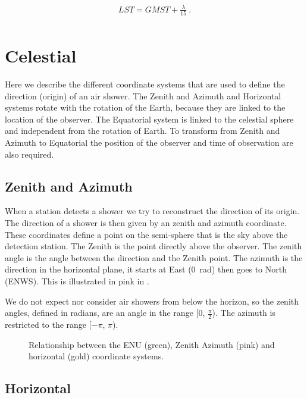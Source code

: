 \begin{equation}
    \begin{array}{l}
        \mathit{LST} = \mathit{GMST} + \frac{\lambda}{15} \ . \\
    \end{array}
\end{equation}


\section{Celestial}
\label{sec:celestial}

Here we describe the different coordinate systems that are used to
define the direction (origin) of an air shower. The Zenith and Azimuth
and Horizontal systems rotate with the rotation of the Earth, because
they are linked to the location of the observer. The Equatorial system
is linked to the celestial sphere and independent from the rotation of
Earth. To transform from Zenith and Azimuth to Equatorial the position
of the observer and time of observation are also required.


\subsection{Zenith and Azimuth}

When a station detects a shower we try to reconstruct the direction of
its origin. The direction of a shower is then given by an zenith and
azimuth coordinate. These coordinates define a point on the semi-sphere
that is the sky above the detection station. The Zenith is the point
directly above the observer. The zenith angle is the angle between the
direction and the Zenith point. The azimuth is the direction in the
horizontal plane, it starts at East (\SI{0}{\radian}) then goes to North
(ENWS). This is illustrated in pink in .

We do not expect nor consider air showers from below the horizon, so the
zenith angles, defined in radians, are an angle in the range [0,
$\frac{\pi}{2}$). The azimuth is restricted to the range [$-\pi$, $\pi$).

\begin{figure}
    \centering
    
    \caption{Relationship between the ENU (green), Zenith Azimuth (pink)
             and horizontal (gold) coordinate systems.}
    \label{fig:enu_horizontal}
\end{figure}


\subsection{Horizontal}

